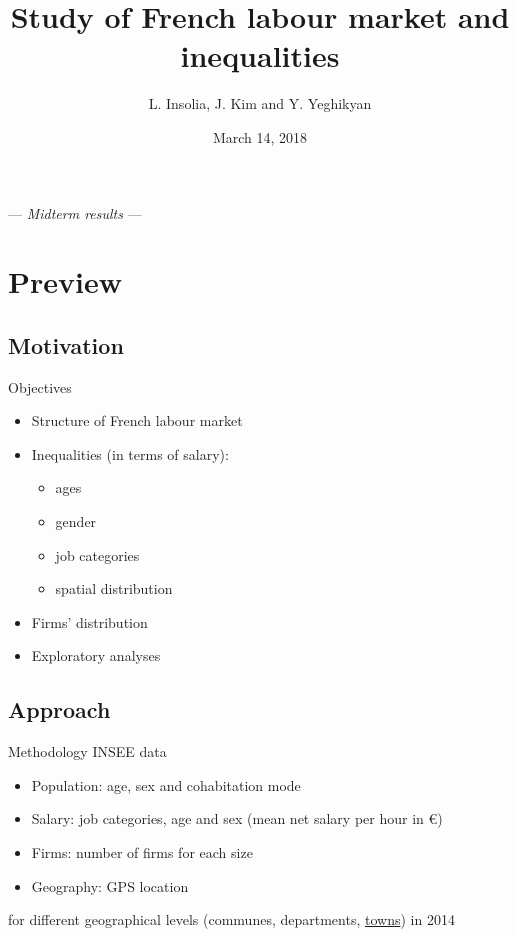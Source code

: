 \documentclass[12pt]{beamer}
\title[Study of French labour market and inequalities]{Study of French labour market and inequalities}
\author{L. Insolia, J. Kim and Y. Yeghikyan}
\institute{SNS}
\date{March 14, 2018}
\begin{document}
	
\begin{frame}
	\maketitle
	\centering\small \textcolor{rscuro}{--- \emph{Midterm results} ---}
\end{frame}


\section{Preview}

\subsection{Motivation}

\begin{frame}{\textcolor{bscuro}{Objectives}}
	\begin{itemize}
		\item Structure of French labour market 
		\item Inequalities (in terms of salary): 
		\begin{itemize}
			\item ages 
			\item gender
			\item job categories
			\item spatial distribution
		\end{itemize}
		\item Firms' distribution
		\item Exploratory analyses
	\end{itemize}
\end{frame}
		

\subsection{Approach}

\begin{frame}{\textcolor{bscuro}{Methodology}}
	INSEE data
	\begin{itemize}
		\item Population: age, sex and cohabitation mode
		\item Salary: job categories, age and sex (mean net salary per hour in \euro)
		\item Firms: number of firms for each size
		\item Geography: GPS location
	\end{itemize}
	for different geographical levels (communes, departments, \underline{towns}) in 2014
\end{frame}
				
\end{document}
